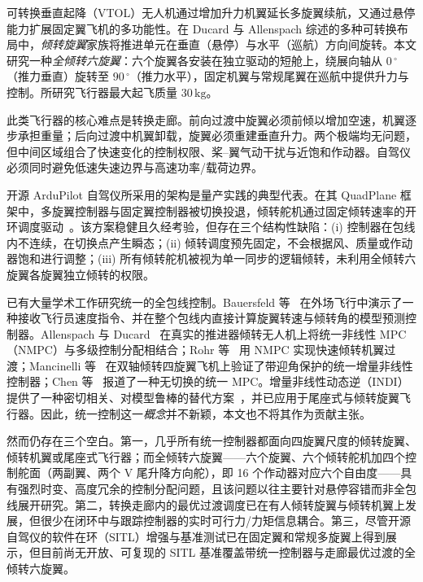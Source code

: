 \documentclass[UTF8,a4paper,11pt]{ctexart}
\newcommand{\SI}[2]{\ensuremath{#1\,#2}}
\newcommand{\kilogram}{\mathrm{kg}}
\newcommand{\degree}{^{\circ}}
\begin{document}
可转换垂直起降（VTOL）无人机通过增加升力机翼延长多旋翼续航，又通过悬停能力扩展固定翼飞机的多功能性。在 Ducard 与 Allenspach 综述的多种可转换布局中，\emph{倾转旋翼}家族将推进单元在垂直（悬停）与水平（巡航）方向间旋转。本文研究一种\emph{全倾转六旋翼}：六个旋翼各安装在独立驱动的短舱上，绕展向轴从 \SI{0}{\degree}（推力垂直）旋转至 \SI{90}{\degree}（推力水平），固定机翼与常规尾翼在巡航中提供升力与控制。所研究飞行器最大起飞质量 \SI{30}{\kilogram}。

此类飞行器的核心难点是转换走廊。前向过渡中旋翼必须前倾以增加空速，机翼逐步承担重量；后向过渡中机翼卸载，旋翼必须重建垂直升力。两个极端均无问题，但中间区域组合了快速变化的控制权限、桨--翼气动干扰与近饱和作动器。自驾仪必须同时避免低速失速边界与高速功率/载荷边界。

开源 ArduPilot 自驾仪所采用的架构是量产实践的典型代表。在其 QuadPlane 框架中，多旋翼控制器与固定翼控制器被切换投退，倾转舵机通过固定倾转速率的开环调度驱动~\cite{ardupilot2024tilt,ardupilot2024transitions}。该方案稳健且久经考验，但存在三个结构性缺陷：(i) 控制器在包线内不连续，在切换点产生瞬态；(ii) 倾转调度预先固定，不会根据风、质量或作动器饱和进行调整；(iii) 所有倾转舵机被视为单一同步的逻辑倾转，未利用全倾转六旋翼各旋翼独立倾转的权限。

已有大量学术工作研究统一的全包线控制。Bauersfeld 等~\cite{bauersfeld2021mpc} 在外场飞行中演示了一种接收飞行员速度指令、并在整个包线内直接计算旋翼转速与倾转角的模型预测控制器。Allenspach 与 Ducard~\cite{allenspach2021nmpc} 在真实的推进器倾转无人机上将统一非线性 MPC（NMPC）与多级控制分配相结合；Rohr 等~\cite{rohr2021nmpc} 用 NMPC 实现快速倾转机翼过渡；Mancinelli 等~\cite{mancinelli2025unified} 在双轴倾转四旋翼飞机上验证了带迎角保护的统一增量非线性控制器；Chen 等~\cite{chen2024unified} 报道了一种无切换的统一 MPC。增量非线性动态逆（INDI）提供了一种密切相关、对模型鲁棒的替代方案~\cite{smeur2020incremental,smeur2018cascaded,smeur2016adaptive,wang2019stability}，并已应用于尾座式与倾转旋翼飞行器。因此，统一控制这一\emph{概念}并不新颖，本文也不将其作为贡献主张。

然而仍存在三个空白。第一，几乎所有统一控制器都面向四旋翼尺度的倾转旋翼、倾转机翼或尾座式飞行器；而全倾转六旋翼——六个旋翼、六个倾转舵机加四个控制舵面（两副翼、两个 V 尾升降方向舵），即 16 个作动器对应六个自由度——具有强烈时变、高度冗余的控制分配问题，且该问题以往主要针对悬停容错而非全包线展开研究。第二，转换走廊内的最优过渡调度已在有人倾转旋翼与倾转机翼上发展，但很少在闭环中与跟踪控制器的实时可行力/力矩信息耦合。第三，尽管开源自驾仪的软件在环（SITL）增强与基准测试已在固定翼和常规多旋翼上得到展示，但目前尚无开放、可复现的 SITL 基准覆盖带统一控制器与走廊最优过渡的全倾转六旋翼。
\end{document}
